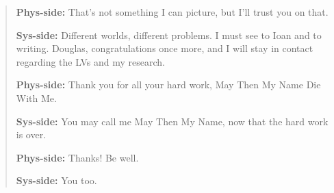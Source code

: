 \begin{quote}
\textbf{Phys-side:} That's not something I can picture, but I'll trust you on that.

\textbf{Sys-side:} Different worlds, different problems. I must see to Ioan and to writing. Douglas, congratulations once more, and I will stay in contact regarding the LVs and my research.

\textbf{Phys-side:} Thank you for all your hard work, May Then My Name Die With Me.

\textbf{Sys-side:} You may call me May Then My Name, now that the hard work is over.

\textbf{Phys-side:} Thanks! Be well.

\textbf{Sys-side:} You too.
\end{quote}
